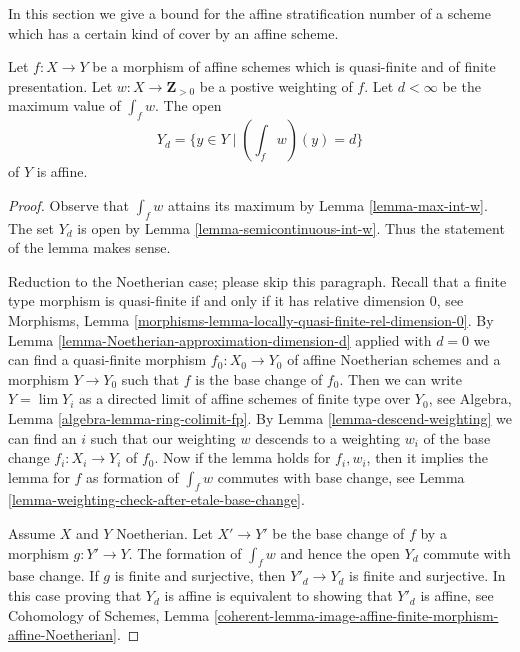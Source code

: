 \noindent
In this section we give a bound for the affine stratification number of a
scheme which has a certain kind of cover by an affine scheme.

\begin{lemma}
\label{lemma-affineness-of-large-open}
Let $f : X \to Y$ be a morphism of affine schemes which is
quasi-finite and of finite presentation.
Let $w : X \to \mathbf{Z}_{> 0}$ be a postive weighting of $f$.
Let $d < \infty$ be the maximum value of $\int_f w$. The open
$$
Y_d = \{y \in Y \mid (\textstyle{\int}_f w)(y) = d \}
$$
of $Y$ is affine.
\end{lemma}

\begin{proof}
Observe that $\int_f w$ attains its maximum by Lemma \ref{lemma-max-int-w}.
The set $Y_d$ is open by Lemma \ref{lemma-semicontinuous-int-w}.
Thus the statement of the lemma makes sense.

\medskip\noindent
Reduction to the Noetherian case; please skip this paragraph.
Recall that a finite type morphism is quasi-finite if and only
if it has relative dimension $0$, see
Morphisms, Lemma \ref{morphisms-lemma-locally-quasi-finite-rel-dimension-0}.
By Lemma \ref{lemma-Noetherian-approximation-dimension-d}
applied with $d = 0$ we can find a quasi-finite morphism $f_0 : X_0 \to Y_0$
of affine Noetherian schemes and a morphism $Y \to Y_0$ such that $f$
is the base change of $f_0$. Then we can write $Y = \lim Y_i$ as a directed
limit of affine schemes of finite type over $Y_0$, see
Algebra, Lemma \ref{algebra-lemma-ring-colimit-fp}.
By Lemma \ref{lemma-descend-weighting}
we can find an $i$ such that our weighting $w$
descends to a weighting $w_i$ of the base change $f_i : X_i \to Y_i$
of $f_0$. Now if the lemma holds for $f_i, w_i$, then it implies
the lemma for $f$ as formation of $\int_f w$ commutes with base
change, see Lemma \ref{lemma-weighting-check-after-etale-base-change}.

\medskip\noindent
Assume $X$ and $Y$ Noetherian. Let $X' \to Y'$ be the base change of $f$
by a morphism $g : Y' \to Y$. The formation of $\int_f w$ and hence
the open $Y_d$ commute with base change. If $g$ is finite and surjective, then
$Y'_d \to Y_d$ is finite and surjective. In this case proving that
$Y_d$ is affine is equivalent to showing that $Y'_d$ is affine, see
Cohomology of Schemes, Lemma
\ref{coherent-lemma-image-affine-finite-morphism-affine-Noetherian}.


\end{proof}
